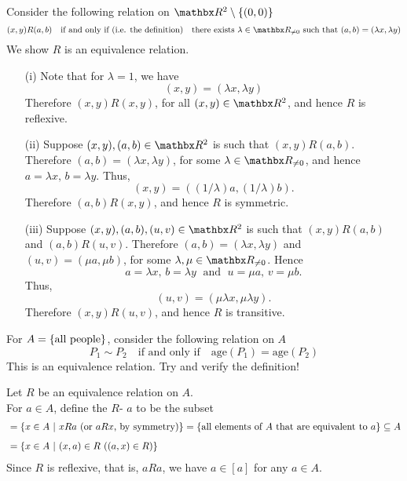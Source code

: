 \vspace*{1em}

\begin{example}\label{example:eqrel2}
Consider the following relation on $\rr^2\setminus\set{(0,0)}$
\[(x,y)R(a,b) \quad \text{if and only if (i.e. the definition)} \quad \text{there exists $\lambda \in \rr_{\neq 0}$ such that $(a,b) = (\lambda x,\lambda y)$}\]
We show $R$ is an equivalence relation.
\begin{itemize}
\item[(i)] Note that for $\lambda = 1$, we have
\[(x,y) = (\lambda x,\lambda y)\]
Therefore $(x,y)R(x,y)$, for all $(x,y) \in \rr^2$, and hence $R$ is reflexive.

\item[(ii)] Suppose $(x,y),(a,b) \in \rr^2$ is such that $(x,y)R(a,b)$. Therefore $(a,b) = (\lambda x,\lambda y)$, for some $\lambda \in \rr_{\neq 0}$, and hence $a = \lambda x,\,b = \lambda y$. Thus,
\[(x,y) = ((1/\lambda)a,(1/\lambda)b).\]
Therefore $(a,b)R(x,y)$, and hence $R$ is symmetric.

\item[(iii)] Suppose $(x,y),(a,b),(u,v) \in \rr^2$ is such that $(x,y)R(a,b)$ and $(a,b)R(u,v)$. Therefore $(a,b) = (\lambda x,\lambda y)$ and $(u,v) = (\mu a,\mu b)$, for some $\lambda,\mu \in \rr_{\neq 0}$. Hence \[a = \lambda x,\,b = \lambda y\; \text{ and }\; u = \mu a,\, v = \mu b.\] Thus,
\[(u,v) = (\mu\lambda x,\mu\lambda y).\]
Therefore $(x,y)R(u,v)$, and hence $R$ is transitive.
\end{itemize}
\end{example}

\vspace*{1em}

\begin{example}\label{example:eqrel3}
For $A = \left\{\text{all people}\right\}$, consider the following relation on $A$
\[P_1 \sim P_2 \quad \text{if and only if} \quad \text{age}(P_1) = \text{age}(P_2)\]
This is an equivalence relation. Try and verify the definition!
\end{example}

\vspace*{1em}

\begin{definition}
Let $R$ be an equivalence relation on $A$.\\[0.5em]
For $a \in A$, define the {\color{blue}$R$-} {\color{blue}$a$} to be the subset
\begin{align*}
[a] &= \setp{x \in A}{xRa \text{ (or $aRx$, by symmetry)}} = \set{\text{all elements of $A$ that are equivalent to $a$}} \subseteq A\\[0.5em]
 &= \setp{x \in A}{\text{$(x,a) \in R$ ($(a,x) \in R$)}}
\end{align*}
Since $R$ is reflexive, that is, $aRa$, we have $a \in [a]$ for any $a \in A$.
\end{definition}

